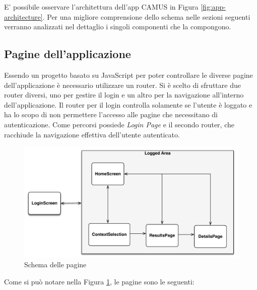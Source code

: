 E’ possibile osservare l’architettura dell’app CAMUS in Figura \ref{fig:app-architecture}. Per una migliore comprensione dello schema nelle sezioni seguenti verranno analizzati nel dettaglio i singoli componenti che la compongono.

\subsection{Pagine dell'applicazione}
Essendo un progetto basato su JavaScript per poter controllare le diverse pagine dell'applicazione è necessario utilizzare un router. Si è scelto di sfruttare due router diversi, uno per gestire il login e un altro per la navigazione all'interno dell'applicazione. Il router per il login controlla solamente se l'utente è loggato e ha lo scopo di non permettere l'accesso alle pagine che necessitano di autenticazione. Come percorsi possiede \emph{Login Page} e il secondo router, che racchiude la navigazione effettiva dell'utente autenticato.
\begin{figure}[H]
	\centering
	\includegraphics[width=\textwidth]{6-implementazione-app/immagini/screen-schema.pdf}
	\caption{Schema delle pagine}\label{fig:screen-schema}
\end{figure}
Come si può notare nella Figura \ref{fig:screen-schema}, le pagine sono le seguenti:
